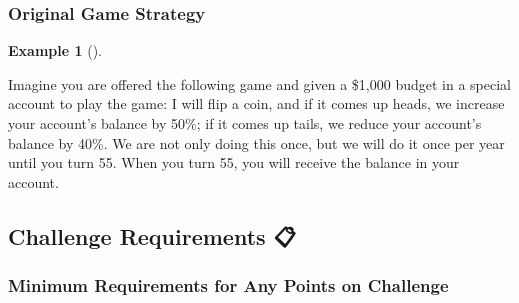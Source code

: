 \documentclass[
  letterpaper,
  DIV=11,
  numbers=noendperiod]{scrartcl}
\theoremstyle{definition}
\newtheorem{example}{Example}[section]
\theoremstyle{remark}
\begin{document}
\subsubsection{Original Game Strategy}\label{original-game-strategy}

\begin{example}[]\protect\hypertarget{exm-ErgodicityEconomicsExample}{}\label{exm-ErgodicityEconomicsExample}

Imagine you are offered the following game and given a \$1,000 budget in
a special account to play the game: I will flip a coin, and if it comes
up heads, we increase your account's balance by 50\%; if it comes up
tails, we reduce your account's balance by 40\%. We are not only doing
this once, but we will do it once per year until you turn 55. When you
turn 55, you will receive the balance in your account.

\end{example}

\subsection{Challenge Requirements 📋}\label{challenge-requirements}

\subsubsection{Minimum Requirements for Any Points on
Challenge}\label{minimum-requirements-for-any-points-on-challenge}
\end{document}
